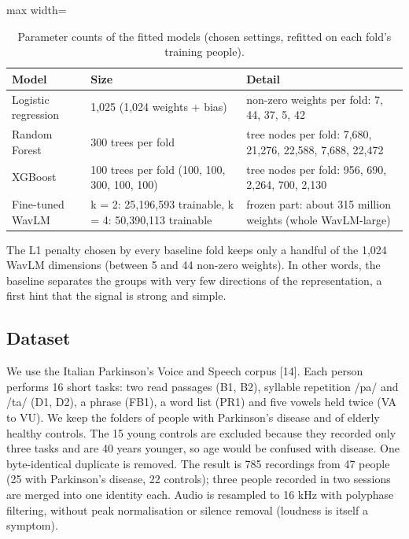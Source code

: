 \documentclass[11pt,a4paper]{article}
\begin{document}
\begin{table}[H]\centering\footnotesize\renewcommand{\arraystretch}{1.15}
\caption{Parameter counts of the fitted models (chosen settings, refitted on each fold's training people).}
\begin{adjustbox}{max width=\linewidth}\begin{tabular}{p{3.2cm}p{5.6cm}p{7.2cm}}
\toprule
\textbf{Model} & \textbf{Size} & \textbf{Detail}\\
\midrule
Logistic regression & 1,025 (1,024 weights + bias) & non-zero weights per fold: 7, 44, 37, 5, 42\\
Random Forest & 300 trees per fold & tree nodes per fold: 7,680, 21,276, 22,588, 7,688, 22,472\\
XGBoost & 100 trees per fold (100, 100, 300, 100, 100) & tree nodes per fold: 956, 690, 2,264, 700, 2,130\\
Fine-tuned WavLM & k = 2: 25,196,593 trainable, k = 4: 50,390,113 trainable & frozen part: about 315 million weights (whole WavLM-large)\\
\bottomrule
\end{tabular}\end{adjustbox}\end{table}
The L1 penalty chosen by every baseline fold keeps only a handful of the 1,024 WavLM dimensions (between 5 and 44 non-zero weights). In other words, the baseline separates the groups with very few directions of the representation, a first hint that the signal is strong and simple.

\subsection{Dataset}\label{sec:dataset}
We use the Italian Parkinson's Voice and Speech corpus [14]. Each person performs 16 short tasks: two read passages (B1, B2), syllable repetition /pa/ and /ta/ (D1, D2), a phrase (FB1), a word list (PR1) and five vowels held twice (VA to VU). We keep the folders of people with Parkinson's disease and of elderly healthy controls. The 15 young controls are excluded because they recorded only three tasks and are 40 years younger, so age would be confused with disease. One byte-identical duplicate is removed. The result is 785 recordings from 47 people (25 with Parkinson's disease, 22 controls); three people recorded in two sessions are merged into one identity each. Audio is resampled to 16 kHz with polyphase filtering, without peak normalisation or silence removal (loudness is itself a symptom).
\end{document}
